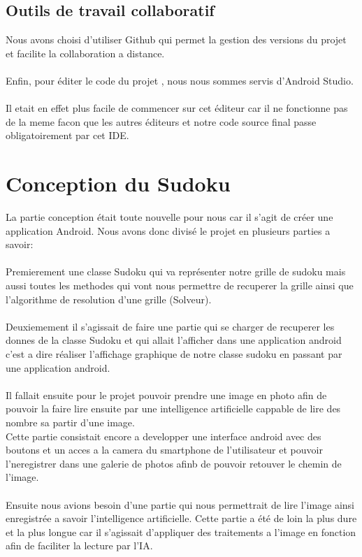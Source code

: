 \documentclass[8pt, french]{article}
\begin{document}
\subsection{Outils de travail collaboratif }
Nous avons choisi d’utiliser Github qui  permet la gestion des versions du projet et facilite la collaboration a distance.\\\\
Enfin, pour éditer le code du projet , nous nous sommes servis d'Android Studio.\\\\
Il etait en effet plus facile de commencer sur cet éditeur car il ne fonctionne pas de la meme facon que les autres éditeurs et notre code source final passe obligatoirement par cet IDE.

\newpage
\section{Conception du Sudoku}
La partie conception était toute nouvelle pour nous car il s'agit de créer une application Android.
Nous avons donc divisé le projet en plusieurs parties a savoir:\\\\
Premierement une classe Sudoku qui va représenter notre grille de sudoku mais aussi toutes les methodes qui vont nous permettre de recuperer la grille ainsi que l'algorithme de resolution d'une grille (Solveur).\\\\

Deuxiemement il s'agissait de faire une partie qui se charger de recuperer les donnes de la classe Sudoku et qui allait l'afficher dans une application android c'est a dire réaliser l'affichage graphique de notre classe sudoku en passant par une application android.\\\\
Il fallait ensuite pour le projet pouvoir prendre une image en photo afin de pouvoir la faire lire ensuite par une intelligence artificielle cappable de lire des nombre sa partir d'une image.\\
Cette partie consistait encore a developper une interface android avec des boutons et un acces a la camera du smartphone de l'utilisateur et pouvoir l'neregistrer dans une galerie de photos afinb de pouvoir retouver le chemin de l'image.\\\\

Ensuite nous avions besoin d'une partie qui nous permettrait de lire l'image ainsi enregistrée a savoir l'intelligence artificielle.
Cette partie a été de loin la plus dure et la plus longue car il s'agissait d'appliquer des traitements a l'image en fonction afin de faciliter la lecture par l'IA.
\end{document}
